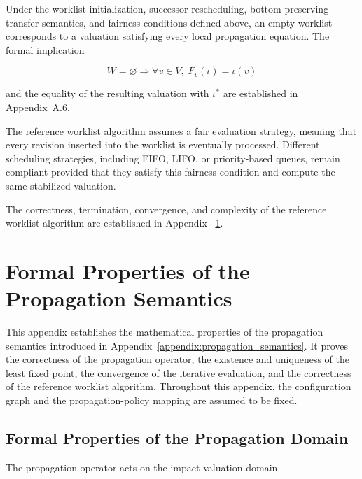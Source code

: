 \documentclass[10pt]{article}
\begin{document}
	Under the worklist initialization, successor rescheduling, bottom-preserving
	transfer semantics, and fairness conditions defined above, an empty worklist
	corresponds to a valuation satisfying every local propagation equation. The
	formal implication
	
	\begin{equation}
		W
		=
		\varnothing
		\Longrightarrow
		\forall v\in V,\;
		F_v(\iota)
		=
		\iota(v)
		\label{eq:worklist_local_equilibrium}
	\end{equation}
	
	and the equality of the resulting valuation with $\iota^{*}$ are established
	in Appendix~A.6.
	
	The reference worklist algorithm assumes a fair evaluation strategy, meaning
	that every revision inserted into the worklist is eventually processed.
	Different scheduling strategies, including FIFO, LIFO, or priority-based
	queues, remain compliant provided that they satisfy this fairness condition and
	compute the same stabilized valuation.
	
	The correctness, termination, convergence, and complexity of the reference
	worklist algorithm are established in Appendix ~\ref{appendix:formal_properties}.
	
	\section{Formal Properties of the Propagation Semantics}
	\label{appendix:formal_properties}
	
	This appendix establishes the mathematical properties of the propagation
	semantics introduced in Appendix~\ref{appendix:propagation_semantics}. It
	proves the correctness of the propagation operator, the existence and
	uniqueness of the least fixed point, the convergence of the iterative
	evaluation, and the correctness of the reference worklist algorithm. Throughout
	this appendix, the configuration graph and the propagation-policy mapping are
	assumed to be fixed.
	
	\subsection{Formal Properties of the Propagation Domain}
	\label{appendix:finite_lattice}
	The propagation operator acts on the impact valuation domain
	
\end{document}
